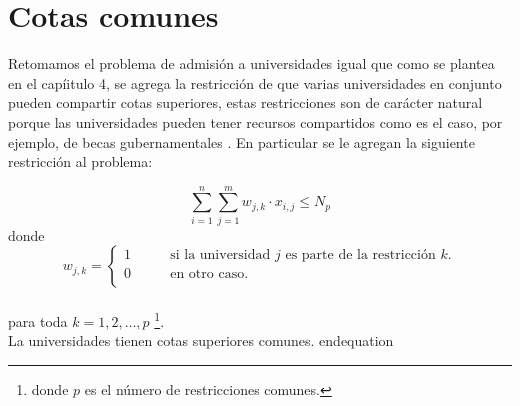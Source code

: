 \chapter{Cotas comunes}

Retomamos el problema de admisión a universidades igual que como se plantea en el capíitulo 4, se agrega la restricción de que varias universidades en conjunto pueden compartir cotas superiores, estas restricciones son de carácter natural porque las universidades pueden tener recursos compartidos como es el caso, por ejemplo, de becas gubernamentales . En particular se le agregan la siguiente restricción al problema:


 \begin{equation}
\sum_{i=1}^{n} \sum_{j=1}^m w_{j,k} \cdot x_{i,j} \leq N_p %
\end{equation} 
donde \begin{equation} w_{j,k}= 
\begin{cases}
1 & \qquad \text{si la universidad $j$ es parte de la restricción $k$.} \\
0 &\qquad\text{en otro caso.} \\ 
\end{cases} \end{equation} \\   para toda $k=1,2,\dots,p$   \footnote{donde $p$ es el número de restricciones comunes.}. \\
La universidades tienen cotas superiores comunes.
 end{equation}




